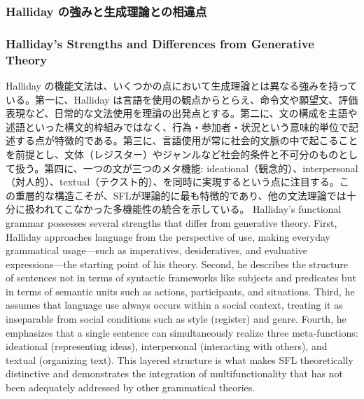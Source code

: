 \ifJPN
\subsubsection{Halliday の強みと生成理論との相違点}
\else
\subsubsection{Halliday's Strengths and Differences from Generative Theory}
\fi

\ifJPN
Halliday の機能文法は、いくつかの点において生成理論とは異なる強みを持っている。第一に、Halliday は言語を使用の観点からとらえ、命令文や願望文、評価表現など、日常的な文法使用を理論の出発点とする。第二に、文の構成を主語や述語といった構文的枠組みではなく、行為・参加者・状況という意味的単位で記述する点が特徴的である。第三に、言語使用が常に社会的文脈の中で起こることを前提とし、文体（レジスター）やジャンルなど社会的条件と不可分のものとして扱う。第四に、一つの文が三つのメタ機能: ideational（観念的）、interpersonal（対人的）、textual（テクスト的）、を同時に実現するという点に注目する。この重層的な構造こそが、SFLが理論的に最も特徴的であり、他の文法理論では十分に扱われてこなかった多機能性の統合を示している。
\else
Halliday's functional grammar possesses several strengths that differ from generative theory. First, Halliday approaches language from the perspective of use, making everyday grammatical usage—such as imperatives, desideratives, and evaluative expressions—the starting point of his theory. Second, he describes the structure of sentences not in terms of syntactic frameworks like subjects and predicates but in terms of semantic units such as actions, participants, and situations. Third, he assumes that language use always occurs within a social context, treating it as inseparable from social conditions such as style (register) and genre. Fourth, he emphasizes that a single sentence can simultaneously realize three meta-functions: ideational (representing ideas), interpersonal (interacting with others), and textual (organizing text). This layered structure is what makes SFL theoretically distinctive and demonstrates the integration of multifunctionality that has not been adequately addressed by other grammatical theories.
\fi

